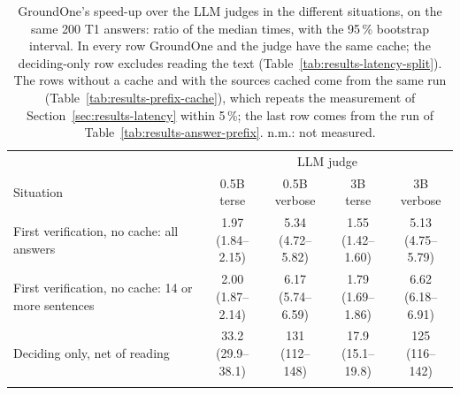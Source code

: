 \begin{table}[htbp]
\centering
\caption{GroundOne's speed-up over the LLM judges in the different situations, on the same 200 T1 answers: ratio of the median times, with the 95\,\% bootstrap interval. In every row GroundOne and the judge have the same cache; the deciding-only row excludes reading the text (Table~\ref{tab:results-latency-split}). The rows without a cache and with the sources cached come from the same run (Table~\ref{tab:results-prefix-cache}), which repeats the measurement of Section~\ref{sec:results-latency} within 5\,\%; the last row comes from the run of Table~\ref{tab:results-answer-prefix}. n.m.: not measured.}
\label{tab:results-speedup-summary}
\small
\setlength{\tabcolsep}{3.5pt}
\begin{tabular}{>{\raggedright\arraybackslash}p{5.4cm}cccc}
\toprule
& \multicolumn{4}{c}{LLM judge} \\ \cmidrule(lr){2-5}
Situation & \makecell{0.5B\\terse} & \makecell{0.5B\\verbose} & \makecell{3B\\terse} & \makecell{3B\\verbose} \\
\midrule
First verification, no cache: all answers & \makecell{1.97\\{\footnotesize (1.84--2.15)}} & \makecell{5.34\\{\footnotesize (4.72--5.82)}} & \makecell{1.55\\{\footnotesize (1.42--1.60)}} & \makecell{5.13\\{\footnotesize (4.75--5.79)}} \\ \addlinespace[2pt]
First verification, no cache: 14 or more sentences & \makecell{2.00\\{\footnotesize (1.87--2.14)}} & \makecell{6.17\\{\footnotesize (5.74--6.59)}} & \makecell{1.79\\{\footnotesize (1.69--1.86)}} & \makecell{6.62\\{\footnotesize (6.18--6.91)}} \\ \addlinespace[2pt]
Deciding only, net of reading & \makecell{33.2\\{\footnotesize (29.9--38.1)}} & \makecell{131\\{\footnotesize (112--148)}} & \makecell{17.9\\{\footnotesize (15.1--19.8)}} & \makecell{125\\{\footnotesize (116--142)}} \\ \addlinespace[2pt]

\end{tabular}
\end{table}
